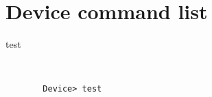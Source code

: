 \chapter{Device command list}
\label{chapter:commands}

\begin{description}
  \item[test] \hfill \\
  \lstset{language=zsh,caption=Test command,label=lst:ctest}
  \begin{lstlisting}
  Device> test
  \end{lstlisting}
\end{description} 
